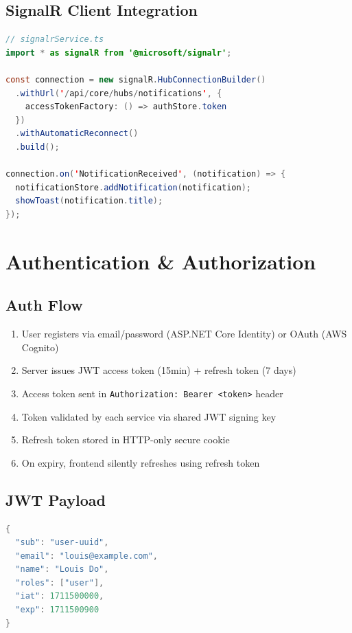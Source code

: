 \documentclass[12pt,letterpaper]{article}
\begin{document}
\subsection{SignalR Client Integration}
\begin{lstlisting}[style=code,language=Java]
// signalrService.ts
import * as signalR from '@microsoft/signalr';

const connection = new signalR.HubConnectionBuilder()
  .withUrl('/api/core/hubs/notifications', {
    accessTokenFactory: () => authStore.token
  })
  .withAutomaticReconnect()
  .build();

connection.on('NotificationReceived', (notification) => {
  notificationStore.addNotification(notification);
  showToast(notification.title);
});
\end{lstlisting}

\newpage

\section{Authentication \& Authorization}

\subsection{Auth Flow}
\begin{enumerate}
  \item User registers via email/password (ASP.NET Core Identity) or OAuth (AWS Cognito)
  \item Server issues JWT access token (15min) + refresh token (7 days)
  \item Access token sent in \texttt{Authorization: Bearer <token>} header
  \item Token validated by each service via shared JWT signing key
  \item Refresh token stored in HTTP-only secure cookie
  \item On expiry, frontend silently refreshes using refresh token
\end{enumerate}

\subsection{JWT Payload}
\begin{lstlisting}[style=code,language=Java]
{
  "sub": "user-uuid",
  "email": "louis@example.com",
  "name": "Louis Do",
  "roles": ["user"],
  "iat": 1711500000,
  "exp": 1711500900
}
\end{lstlisting}
\end{document}
